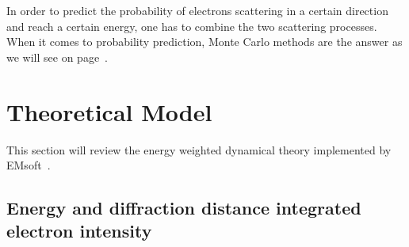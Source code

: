 In order to predict the probability of electrons scattering in a certain direction and reach a certain energy, one has to combine the two scattering processes. When it comes to probability prediction, Monte Carlo methods are the answer as we will see on page~\pageref{sec:MC}.





\section{Theoretical Model}
\label{sec:TKDtheory}

This section will review the energy weighted dynamical theory implemented by EMsoft~\cite{EMsoft}.

%
\subsection{Energy and diffraction distance integrated electron intensity}
\label{sec:energy_weight}


